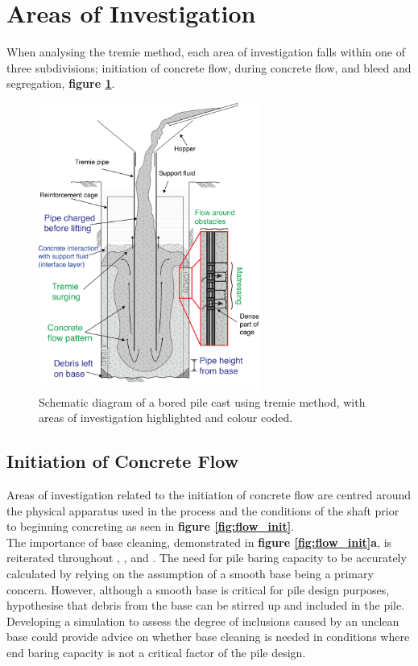 \section{Areas of Investigation}

When analysing the tremie method, each area of investigation falls within one of three subdivisions; initiation of concrete flow, during concrete flow, and bleed and segregation, {\bfseries figure \ref{fig:tremie_colour}}.

\begin{figure}[H]
\centering
\includegraphics[width=0.65\textwidth]{tremie_colour.png}
\caption{\label{fig:tremie_colour} Schematic diagram of a bored pile cast using tremie method, with areas of investigation highlighted and colour coded.}
\end{figure}


\subsection{Initiation of Concrete Flow}

Areas of investigation related to the initiation of concrete flow are centred around the physical apparatus used in the process and the conditions of the shaft prior to beginning concreting as seen in {\bfseries figure \ref{fig:flow_init}}.\\

\noindent
The importance of base cleaning, demonstrated in {\bfseries figure \ref{fig:flow_init}a}, is reiterated throughout \citeauthor{BS1536}, , and . The need for pile baring capacity to be accurately calculated by relying on the assumption of a smooth base being a primary concern. However, although a smooth base is critical for pile design purposes,  hypothesise that debris from the base can be stirred up and included in the pile. Developing a simulation to assess the degree of inclusions caused by an unclean base could provide advice on whether base cleaning is needed in conditions where end baring capacity is not a critical factor of the pile design.\\

